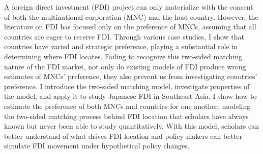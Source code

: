 \abstract

A foreign direct investment (FDI) project can only materialize with the consent of both the multinational corporation (MNC) and the host country. However, the literature on FDI has focused only on the preference of MNCs, assuming that all countries are eager to receive FDI. Through various case studies, I show that countries have varied and strategic preference, playing a substantial role in determining where FDI locates. Failing to recognize this two-sided matching nature of the FDI market, not only do existing models of FDI produce wrong estimates of MNCs' preference, they also prevent us from investigating countries' preference. I introduce the two-sided matching model, investigate properties of the model, and apply it to study Japanese FDI in Southeast Asia. I show how to estimate the preference of both MNCs and countries for one another, modeling the two-sided matching process behind FDI location that scholars have always known but never been able to study quantitatively. With this model, scholars can better understand of what drives FDI location and policy makers can better simulate FDI movement under hypothetical policy changes.
